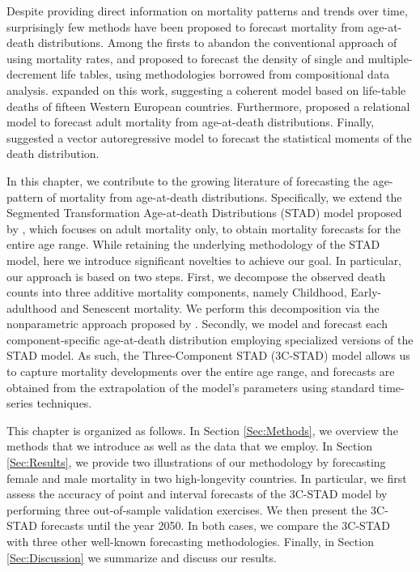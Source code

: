 \documentclass[11pt, a4paper]{article}
\begin{document}
Despite providing direct information on mortality patterns and trends over time, surprisingly few methods have been proposed to forecast mortality from age-at-death distributions. Among the firsts to abandon the conventional approach of using mortality rates, \cite{oeppen2008coherent} and \cite{oeppen2013coherent} proposed to forecast the density of single and multiple-decrement life tables, using methodologies borrowed from compositional data analysis. \cite{bergeron2017coherent} expanded on this work, suggesting a coherent model based on life-table deaths of fifteen Western European countries. Furthermore, \cite{basellini2019stad} proposed a relational model to forecast adult mortality from age-at-death distributions. Finally, \cite{pascariu2019maximum} suggested a vector autoregressive model to forecast the statistical moments of the death distribution.
  
In this chapter, we contribute to the growing literature of forecasting the age-pattern of mortality from age-at-death distributions. Specifically, we extend the Segmented Transformation Age-at-death Distributions (STAD) model proposed by \cite{basellini2019stad}, which focuses on adult mortality only, to obtain mortality forecasts for the entire age range. While retaining the underlying methodology of the STAD model, here we introduce significant novelties to achieve our goal. In particular, our approach is based on two steps. First, we decompose the observed death counts into three additive mortality components, namely Childhood, Early-adulthood and Senescent mortality. We perform this decomposition via the nonparametric approach proposed by \cite{camarda2016sums}. Secondly, we model and forecast each component-specific age-at-death distribution employing specialized versions of the STAD model. As such, the Three-Component STAD (3C-STAD) model allows us to capture mortality developments over the entire age range, and forecasts are obtained from the extrapolation of the model's parameters using standard time-series techniques. 

This chapter is organized as follows. In Section \ref{Sec:Methods}, we overview the methods that we introduce as well as the data that we employ. In Section \ref{Sec:Results}, we provide two illustrations of our methodology by forecasting female and male mortality in two high-longevity countries. In particular, we first assess the accuracy of point and interval forecasts of the 3C-STAD model by performing three out-of-sample validation exercises. We then present the 3C-STAD forecasts until the year 2050. In both cases, we compare the 3C-STAD with three other well-known forecasting methodologies. Finally, in Section \ref{Sec:Discussion} we summarize and discuss our results. 
\end{document}
